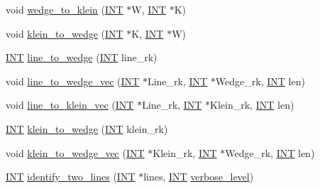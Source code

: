 \begin{DoxyCompactItemize}
\item 
void \mbox{\hyperlink{classsurface_aa6fb4daa3a79dc65bbb30239076a87a5}{wedge\+\_\+to\+\_\+klein}} (\mbox{\hyperlink{galois_8h_a09fddde158a3a20bd2dcadb609de11dc}{I\+NT}} $\ast$W, \mbox{\hyperlink{galois_8h_a09fddde158a3a20bd2dcadb609de11dc}{I\+NT}} $\ast$K)
\item 
void \mbox{\hyperlink{classsurface_afe0396f2f4912d7b975c3c7f4bc5853b}{klein\+\_\+to\+\_\+wedge}} (\mbox{\hyperlink{galois_8h_a09fddde158a3a20bd2dcadb609de11dc}{I\+NT}} $\ast$K, \mbox{\hyperlink{galois_8h_a09fddde158a3a20bd2dcadb609de11dc}{I\+NT}} $\ast$W)
\item 
\mbox{\hyperlink{galois_8h_a09fddde158a3a20bd2dcadb609de11dc}{I\+NT}} \mbox{\hyperlink{classsurface_aea15853e991bf9a363abf647f8bcb70c}{line\+\_\+to\+\_\+wedge}} (\mbox{\hyperlink{galois_8h_a09fddde158a3a20bd2dcadb609de11dc}{I\+NT}} line\+\_\+rk)
\item 
void \mbox{\hyperlink{classsurface_a994181d5df6a966940ad798411f21fe8}{line\+\_\+to\+\_\+wedge\+\_\+vec}} (\mbox{\hyperlink{galois_8h_a09fddde158a3a20bd2dcadb609de11dc}{I\+NT}} $\ast$Line\+\_\+rk, \mbox{\hyperlink{galois_8h_a09fddde158a3a20bd2dcadb609de11dc}{I\+NT}} $\ast$Wedge\+\_\+rk, \mbox{\hyperlink{galois_8h_a09fddde158a3a20bd2dcadb609de11dc}{I\+NT}} len)
\item 
void \mbox{\hyperlink{classsurface_a8b1782041fccd2d147fdeef4fe08e3a6}{line\+\_\+to\+\_\+klein\+\_\+vec}} (\mbox{\hyperlink{galois_8h_a09fddde158a3a20bd2dcadb609de11dc}{I\+NT}} $\ast$Line\+\_\+rk, \mbox{\hyperlink{galois_8h_a09fddde158a3a20bd2dcadb609de11dc}{I\+NT}} $\ast$Klein\+\_\+rk, \mbox{\hyperlink{galois_8h_a09fddde158a3a20bd2dcadb609de11dc}{I\+NT}} len)
\item 
\mbox{\hyperlink{galois_8h_a09fddde158a3a20bd2dcadb609de11dc}{I\+NT}} \mbox{\hyperlink{classsurface_a3c8c160b16bc586f45d0c23e6b2e3e00}{klein\+\_\+to\+\_\+wedge}} (\mbox{\hyperlink{galois_8h_a09fddde158a3a20bd2dcadb609de11dc}{I\+NT}} klein\+\_\+rk)
\item 
void \mbox{\hyperlink{classsurface_a975f69ead008c4869721ae32f92d70d8}{klein\+\_\+to\+\_\+wedge\+\_\+vec}} (\mbox{\hyperlink{galois_8h_a09fddde158a3a20bd2dcadb609de11dc}{I\+NT}} $\ast$Klein\+\_\+rk, \mbox{\hyperlink{galois_8h_a09fddde158a3a20bd2dcadb609de11dc}{I\+NT}} $\ast$Wedge\+\_\+rk, \mbox{\hyperlink{galois_8h_a09fddde158a3a20bd2dcadb609de11dc}{I\+NT}} len)
\item 
\mbox{\hyperlink{galois_8h_a09fddde158a3a20bd2dcadb609de11dc}{I\+NT}} \mbox{\hyperlink{classsurface_a1417ffd697aae87bf0301d8bbe475dfd}{identify\+\_\+two\+\_\+lines}} (\mbox{\hyperlink{galois_8h_a09fddde158a3a20bd2dcadb609de11dc}{I\+NT}} $\ast$lines, \mbox{\hyperlink{galois_8h_a09fddde158a3a20bd2dcadb609de11dc}{I\+NT}} \mbox{\hyperlink{simeon_8_c_a818073fbcc2f439e7c56952f67386122}{verbose\+\_\+level}})

\end{DoxyCompactItemize}
